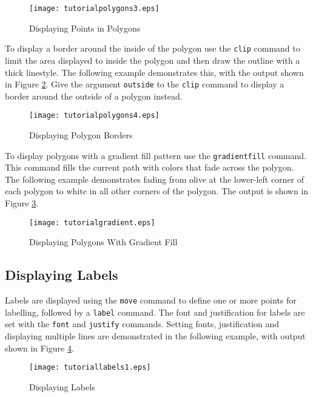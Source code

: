 \begin{figure}[htb]
\texttt{[image: tutorialpolygons3.eps]}
\caption{Displaying Points in Polygons}
\label{tutorialpolygons3}
\end{figure}

To display a border around the inside of the polygon
use the \texttt{clip}
command to limit the area displayed to inside the polygon
and then draw the outline with a thick linestyle.
The following example demonstrates this, with the output shown
in Figure \ref{tutorialpolygons4}.
Give the argument \texttt{outside}
to the \texttt{clip} command
to display a border around the outside of a polygon instead.



\begin{figure}[htb]
\texttt{[image: tutorialpolygons4.eps]}
\caption{Displaying Polygon Borders}
\label{tutorialpolygons4}
\end{figure}

To display polygons with a gradient fill pattern use
the \texttt{gradientfill} command.
This command fills the current path with colors that fade
across the polygon.
The following example demonstrates fading from olive at the
lower-left corner of each polygon to white in all other corners
of the polygon.  The output is shown in Figure \ref{tutorialgradient}.



\begin{figure}[htb]
\texttt{[image: tutorialgradient.eps]}
\caption{Displaying Polygons With Gradient Fill}
\label{tutorialgradient}
\end{figure}

\subsection{Displaying Labels}

Labels are displayed using the \texttt{move}
command to define one or more points for labelling, followed by a
\texttt{label} command.  The font and justification for labels
are set with the \texttt{font} and \texttt{justify} commands.
Setting fonts, justification and displaying multiple lines
are demonstrated in the following example, with output
shown in Figure \ref{tutoriallabels1}.



\begin{figure}[htb]
\texttt{[image: tutoriallabels1.eps]}
\caption{Displaying Labels}
\label{tutoriallabels1}
\end{figure}

